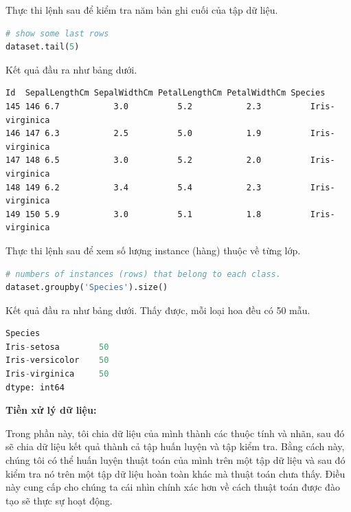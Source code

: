 Thực thi lệnh sau để kiểm tra năm bản ghi cuối của tập dữ liệu.

\begin{center}
\begin{lstlisting}[language=Python,breaklines=true]
# show some last rows
dataset.tail(5)
\end{lstlisting}
\end{center}

Kết quả đầu ra như bảng dưới.

\begin{center}
\begin{lstlisting}[basicstyle=\fontsize{9}{13}\selectfont\ttfamily]
    Id  SepalLengthCm SepalWidthCm PetalLengthCm PetalWidthCm Species
145 146 6.7           3.0          5.2           2.3          Iris-virginica
146 147 6.3           2.5          5.0           1.9          Iris-virginica
147 148 6.5           3.0          5.2           2.0          Iris-virginica
148 149 6.2           3.4          5.4           2.3          Iris-virginica
149 150 5.9           3.0          5.1           1.8          Iris-virginica
\end{lstlisting}
\end{center}

Thực thi lệnh sau để xem số lượng instance (hàng) thuộc về từng lớp.

\begin{center}
\begin{lstlisting}[language=Python,breaklines=true]
# numbers of instances (rows) that belong to each class.
dataset.groupby('Species').size()
\end{lstlisting}
\end{center}

Kết quả đầu ra như bảng dưới. Thấy được, mỗi loại hoa đều có 50 mẫu.

\begin{center}
\begin{lstlisting}[language=Python,breaklines=true]
Species
Iris-setosa        50
Iris-versicolor    50
Iris-virginica     50
dtype: int64
\end{lstlisting}
\end{center}

\textbf{Tiền xử lý dữ liệu:}

Trong phần này, tôi chia dữ liệu của mình thành các thuộc tính và nhãn,
sau đó sẽ chia dữ liệu kết quả thành cả tập huấn luyện và tập kiểm tra.
Bằng cách này, chúng tôi có thể huấn luyện thuật toán của mình trên
một tập dữ liệu và sau đó kiểm tra nó trên một tập dữ liệu hoàn toàn khác
mà thuật toán chưa thấy. Điều này cung cấp cho chúng ta cái nhìn
chính xác hơn về cách thuật toán được đào tạo sẽ thực sự hoạt động.

